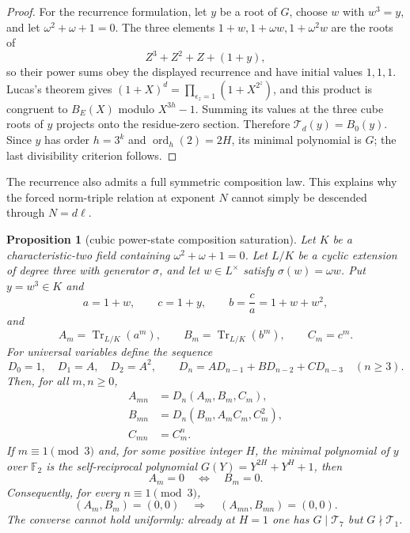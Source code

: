 \documentclass[11pt]{article}
\newtheorem{proposition}[theorem]{Proposition}
\theoremstyle{definition}
\theoremstyle{remark}
\begin{document}
\begin{proof}
For the recurrence formulation, let $y$ be a root of $G$, choose $w$ with
$w^3=y$, and let $\omega^2+\omega+1=0$.  The three elements
$1+w,1+\omega w,1+\omega^2w$ are the roots of
\[
 Z^3+Z^2+Z+(1+y),
\]
so their power sums obey the displayed recurrence and have initial values
$1,1,1$.  Lucas's theorem gives
$(1+X)^d=\prod_{\epsilon_z=1}(1+X^{2^z})$, and this product is congruent to
$B_E(X)$ modulo $X^{3h}-1$.  Summing its values at the three cube roots of
$y$ projects onto the residue-zero section.  Therefore
$\mathcal T_d(y)=B_0(y)$.  Since $y$ has order $h=3^k$ and
$\operatorname{ord}_h(2)=2H$, its minimal polynomial is $G$; the last
divisibility criterion follows.
\end{proof}

The recurrence also admits a full symmetric composition law.  This explains
why the forced norm-triple relation at exponent $N$ cannot simply be
descended through $N=d\ell$.

\begin{proposition}[cubic power-state composition saturation]
\label{prop:c-composition}
Let $K$ be a characteristic-two field containing
$\omega^2+\omega+1=0$.  Let $L/K$ be a cyclic extension of degree three
with generator $\sigma$, and let $w\in L^\times$ satisfy
$\sigma(w)=\omega w$.  Put $y=w^3\in K$ and
\[
 a=1+w,\qquad c=1+y,\qquad b=\frac ca=1+w+w^2,
\]
and
\[
 A_m=\operatorname{Tr}_{L/K}(a^m),\qquad
 B_m=\operatorname{Tr}_{L/K}(b^m),\qquad C_m=c^m.
\]
For universal variables define the sequence
\[
 D_0=1,\quad D_1=A,\quad D_2=A^2,\qquad
 D_n=AD_{n-1}+BD_{n-2}+CD_{n-3}\quad(n\geq3).
\]
Then, for all $m,n\geq0$,
\[
 \begin{aligned}
 A_{mn}&=D_n(A_m,B_m,C_m),\\
 B_{mn}&=D_n(B_m,A_mC_m,C_m^2),\\
 C_{mn}&=C_m^n.
 \end{aligned}
\]
If $m\equiv1\pmod3$ and, for some positive integer
$H$, the minimal polynomial of $y$ over $\mathbb F_2$ is the
self-reciprocal polynomial $G(Y)=Y^{2H}+Y^H+1$, then
\[
 A_m=0\quad\Longleftrightarrow\quad B_m=0.
\]
Consequently, for every $n\equiv1\pmod3$,
\[
 (A_m,B_m)=(0,0)\quad\Longrightarrow\quad
 (A_{mn},B_{mn})=(0,0).
\]
The converse cannot hold uniformly: already at $H=1$ one has
$G\mid\mathcal T_7$ but $G\nmid\mathcal T_1$.
\end{proposition}
\end{document}
